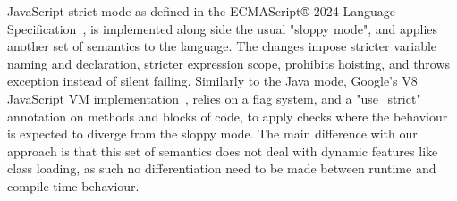 JavaScript strict mode as defined in the ECMAScript® 2024 Language Specification~\cite{noauthor_ecmascript_nodate}, is implemented along side the usual "sloppy mode", and applies another set of semantics to the language. The changes impose stricter variable naming and declaration, stricter expression scope, prohibits hoisting, and throws exception instead of silent failing. Similarly to the Java mode, Google's V8 JavaScript VM implementation~\cite{noauthor_v8_nodate}, relies on a flag system, and a "use\_strict" annotation on methods and blocks of code, to apply checks where the behaviour is expected to diverge from the sloppy mode. The main difference with our approach is that this set of semantics does not deal with dynamic features like class loading, as such no differentiation need to be made between runtime and compile time behaviour. 